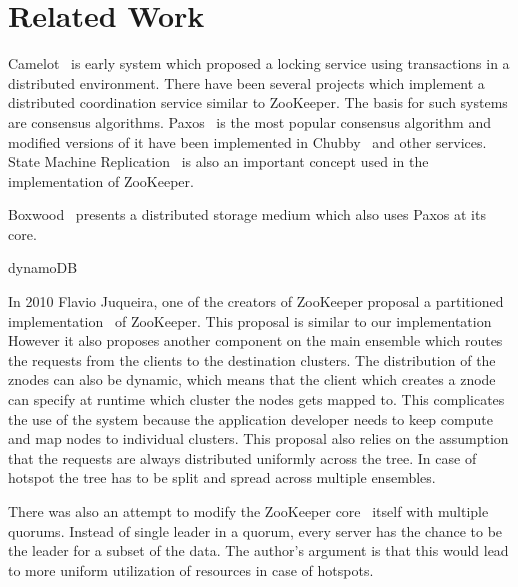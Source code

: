 \chapter{Related Work}
Camelot~\cite{hastings1990distributed} is early system which proposed a locking service using transactions in a distributed environment. 
There have been several projects which implement a distributed coordination service similar to ZooKeeper. The basis for such systems are consensus algorithms. Paxos~\cite{lamport2001paxos} is the most popular consensus algorithm and modified versions of it have been implemented in Chubby~\cite{burrows2006chubby} and other services. State Machine Replication~\cite{schneider1990implementing} is also an important concept used in the implementation of ZooKeeper.

Boxwood~\cite{maccormick2004boxwood} presents a distributed storage medium which also uses Paxos at its core.

dynamoDB~\cite{vogels2012amazon}

In 2010 Flavio Juqueira, one of the creators of ZooKeeper proposal a partitioned implementation~\cite{junqueira2010partitioned} of ZooKeeper. This proposal is similar to our implementation However it also proposes another component on the main ensemble which routes the requests from the clients to the destination clusters. The distribution of the znodes can also be dynamic, which means that the client which creates a znode can specify at runtime which cluster the nodes gets mapped to. This complicates the use of the system because the application developer needs to keep compute and map nodes to individual clusters. This proposal also relies on the assumption that the requests are always distributed uniformly across the tree. In case of hotspot the tree has to be split and spread across multiple ensembles.

There was also an attempt to modify the ZooKeeper core~\cite{biligiri2014multiquorum} itself with multiple quorums. Instead of single leader in a quorum, every server has the chance to be the leader for a subset of the data. The author's argument is that this would lead to more uniform utilization of resources in case of hotspots. 

